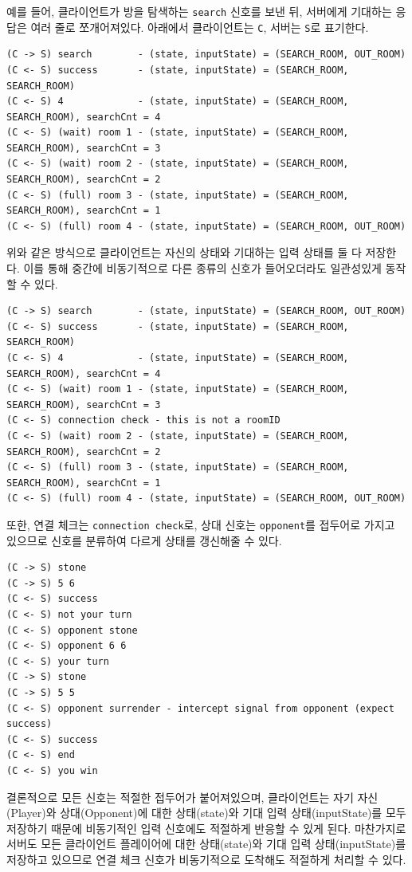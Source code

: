 \documentclass[a4paper, 10pt]{article}
\begin{document}
예를 들어, 클라이언트가 방을 탐색하는 \texttt{search} 신호를 보낸 뒤, 서버에게
기대하는 응답은 여러 줄로 쪼개어져있다. 아래에서 클라이언트는 \texttt{C},
서버는 \texttt{S}로 표기한다.
\begin{Verbatim}[tabsize=4,xleftmargin=2em]
(C -> S) search        - (state, inputState) = (SEARCH_ROOM, OUT_ROOM)
(C <- S) success       - (state, inputState) = (SEARCH_ROOM, SEARCH_ROOM)
(C <- S) 4             - (state, inputState) = (SEARCH_ROOM, SEARCH_ROOM), searchCnt = 4
(C <- S) (wait) room 1 - (state, inputState) = (SEARCH_ROOM, SEARCH_ROOM), searchCnt = 3
(C <- S) (wait) room 2 - (state, inputState) = (SEARCH_ROOM, SEARCH_ROOM), searchCnt = 2
(C <- S) (full) room 3 - (state, inputState) = (SEARCH_ROOM, SEARCH_ROOM), searchCnt = 1
(C <- S) (full) room 4 - (state, inputState) = (SEARCH_ROOM, OUT_ROOM)
\end{Verbatim}
위와 같은 방식으로 클라이언트는 자신의 상태와 기대하는 입력 상태를 둘 다 저장한다.
이를 통해 중간에 비동기적으로 다른 종류의 신호가 들어오더라도 일관성있게
동작할 수 있다.
\begin{Verbatim}[tabsize=4,xleftmargin=2em]
(C -> S) search        - (state, inputState) = (SEARCH_ROOM, OUT_ROOM)
(C <- S) success       - (state, inputState) = (SEARCH_ROOM, SEARCH_ROOM)
(C <- S) 4             - (state, inputState) = (SEARCH_ROOM, SEARCH_ROOM), searchCnt = 4
(C <- S) (wait) room 1 - (state, inputState) = (SEARCH_ROOM, SEARCH_ROOM), searchCnt = 3
(C <- S) connection check - this is not a roomID
(C <- S) (wait) room 2 - (state, inputState) = (SEARCH_ROOM, SEARCH_ROOM), searchCnt = 2
(C <- S) (full) room 3 - (state, inputState) = (SEARCH_ROOM, SEARCH_ROOM), searchCnt = 1
(C <- S) (full) room 4 - (state, inputState) = (SEARCH_ROOM, OUT_ROOM)
\end{Verbatim}
또한, 연결 체크는 \texttt{connection check}로, 상대 신호는 \texttt{opponent}를
접두어로 가지고 있으므로 신호를 분류하여 다르게 상태를 갱신해줄 수 있다.
\begin{Verbatim}[tabsize=4,xleftmargin=2em]
(C -> S) stone
(C -> S) 5 6
(C <- S) success
(C <- S) not your turn
(C <- S) opponent stone
(C <- S) opponent 6 6
(C <- S) your turn
(C -> S) stone
(C -> S) 5 5
(C <- S) opponent surrender - intercept signal from opponent (expect success)
(C <- S) success
(C <- S) end
(C <- S) you win
\end{Verbatim}

결론적으로 모든 신호는 적절한 접두어가 붙어져있으며,
클라이언트는 자기 자신(Player)와 상대(Opponent)에 대한 상태(state)와
기대 입력 상태(inputState)를 모두 저장하기 때문에 비동기적인 입력 신호에도
적절하게 반응할 수 있게 된다. 마찬가지로 서버도 모든 클라이언트 플레이어에
대한 상태(state)와 기대 입력 상태(inputState)를 저장하고 있으므로
연결 체크 신호가 비동기적으로 도착해도 적절하게 처리할 수 있다.
\newpage
\end{document}
